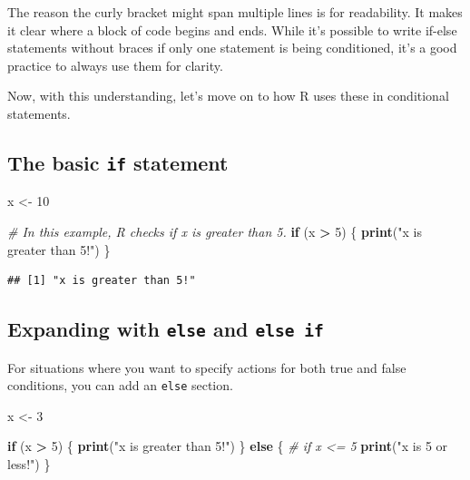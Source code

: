 \documentclass[
]{book}
\newenvironment{Shaded}{\begin{snugshade}}{\end{snugshade}}
\newcommand{\CommentTok}[1]{\textcolor[rgb]{0.56,0.35,0.01}{\textit{#1}}}
\newcommand{\ControlFlowTok}[1]{\textcolor[rgb]{0.13,0.29,0.53}{\textbf{#1}}}
\newcommand{\DecValTok}[1]{\textcolor[rgb]{0.00,0.00,0.81}{#1}}
\newcommand{\FunctionTok}[1]{\textcolor[rgb]{0.13,0.29,0.53}{\textbf{#1}}}
\newcommand{\NormalTok}[1]{#1}
\newcommand{\OtherTok}[1]{\textcolor[rgb]{0.56,0.35,0.01}{#1}}
\newcommand{\SpecialCharTok}[1]{\textcolor[rgb]{0.81,0.36,0.00}{\textbf{#1}}}
\newcommand{\StringTok}[1]{\textcolor[rgb]{0.31,0.60,0.02}{#1}}
\begin{document}
The reason the curly bracket might span multiple lines is for readability. It makes it clear where a block of code begins and ends. While it's possible to write if-else statements without braces if only one statement is being conditioned, it's a good practice to always use them for clarity.

Now, with this understanding, let's move on to how R uses these in conditional statements.

\hypertarget{the-basic-if-statement}{%
\subsection{\texorpdfstring{The basic \texttt{if} statement}{The basic if statement}}\label{the-basic-if-statement}}

\begin{Shaded}
\begin{Highlighting}[]
\NormalTok{x }\OtherTok{\textless{}{-}} \DecValTok{10}

\CommentTok{\# In this example, R checks if x is greater than 5. }
\ControlFlowTok{if}\NormalTok{ (x }\SpecialCharTok{\textgreater{}} \DecValTok{5}\NormalTok{) \{}
  \FunctionTok{print}\NormalTok{(}\StringTok{"x is greater than 5!"}\NormalTok{)}
\NormalTok{\}}
\end{Highlighting}
\end{Shaded}

\begin{verbatim}
## [1] "x is greater than 5!"
\end{verbatim}

\hypertarget{expanding-with-else-and-else-if}{%
\subsection{\texorpdfstring{Expanding with \texttt{else} and \texttt{else\ if}}{Expanding with else and else if}}\label{expanding-with-else-and-else-if}}

For situations where you want to specify actions for both true and false conditions, you can add an \texttt{else} section.

\begin{Shaded}
\begin{Highlighting}[]
\NormalTok{x }\OtherTok{\textless{}{-}} \DecValTok{3}

\ControlFlowTok{if}\NormalTok{ (x }\SpecialCharTok{\textgreater{}} \DecValTok{5}\NormalTok{) \{}
  \FunctionTok{print}\NormalTok{(}\StringTok{"x is greater than 5!"}\NormalTok{)}
\NormalTok{\} }\ControlFlowTok{else}\NormalTok{ \{ }\CommentTok{\# if x \textless{}= 5}
  \FunctionTok{print}\NormalTok{(}\StringTok{"x is 5 or less!"}\NormalTok{)}
\NormalTok{\}}
\end{Highlighting}
\end{Shaded}
\end{document}
